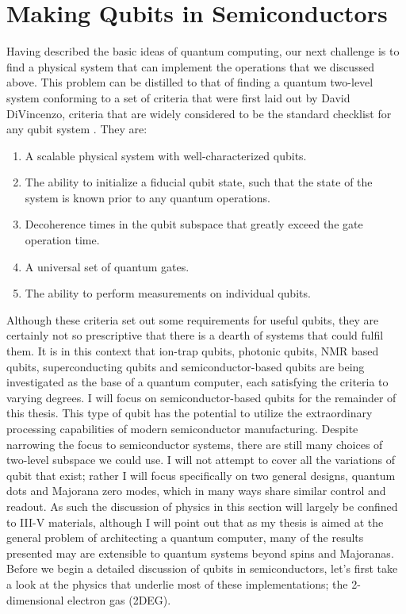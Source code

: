 \section{Making Qubits in Semiconductors}
\label{sec:qcinsm}
Having described the basic ideas of quantum computing, our next challenge is to find a physical system that
can implement the operations that we discussed above. This problem can be distilled to that
of finding a quantum two-level system conforming to a set of criteria that were first laid out by David
DiVincenzo, criteria that are widely considered to be the standard checklist for any qubit system \cite{divincenzo_crit}. They are:
\begin{enumerate}
  \item A scalable physical system with well-characterized qubits.
  \item The ability to initialize a fiducial qubit state, such that the state of the system is known prior
    to any quantum operations.
  \item Decoherence times in the qubit subspace that greatly exceed the gate operation time.
  \item A universal set of quantum gates.
  \item The ability to perform measurements on individual qubits.
\end{enumerate}
Although these criteria set out some requirements for useful qubits, they are certainly not so prescriptive
that there is a dearth of systems that could fulfil them. It is in this context that ion-trap qubits, photonic qubits,
NMR based qubits, superconducting qubits and semiconductor-based qubits are being investigated as the base of a quantum computer, each satisfying the
criteria to varying degrees. I will focus on semiconductor-based qubits for the remainder of this thesis. This type
of qubit has the potential to utilize the extraordinary processing capabilities of modern semiconductor manufacturing.
Despite narrowing the focus to semiconductor systems, there are still many
choices of two-level subspace we could use. I will not attempt to cover all the variations
of qubit that exist; rather I will focus specifically on two general designs, quantum dots and Majorana zero modes,
which in many ways share similar control and readout. As such the discussion of physics in this section will
largely be confined to III-V materials, although I will point out that as my thesis is aimed at the general
problem of architecting a quantum computer, many of the results presented may are extensible to quantum
systems beyond spins and Majoranas. Before we begin a detailed discussion of qubits in semiconductors, let's first take a look
at the physics that underlie most of these implementations; the 2-dimensional electron gas (2DEG).

